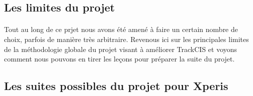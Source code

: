 		\subsection{Les limites du projet}
			\paragraph{}%
			Tout au long de ce prjet nous avons été amené à faire un certain nombre de
			choix, parfois de manière très arbitraire. Revenous ici sur les principales
			limites de la méthodologie globale du projet visant à améliorer TrackCIS et
			voyons comment nous pouvons en tirer les leçons pour préparer la suite du
			projet.
		
			\paragraph{}%
			
			\paragraph{}%
			
		\subsection{Les suites possibles du projet pour Xperis}
			\paragraph{}%
			
			\paragraph{}%
			
			